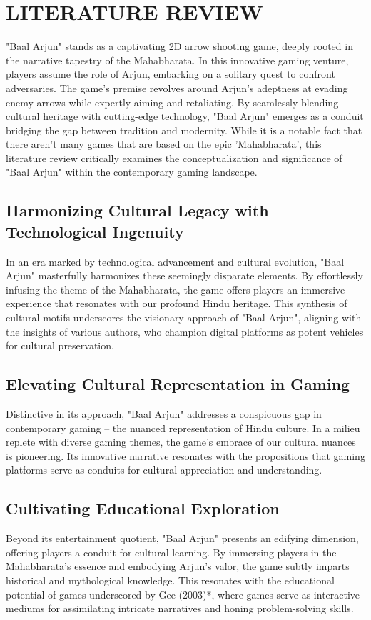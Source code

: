 \section{LITERATURE REVIEW}
"Baal Arjun" stands as a captivating 2D arrow shooting game, deeply rooted in the narrative tapestry of the Mahabharata. In this innovative gaming venture, players assume the role of Arjun, embarking on a solitary quest to confront adversaries. The game's premise revolves around Arjun's adeptness at evading enemy arrows while expertly aiming and retaliating. By seamlessly blending cultural heritage with cutting-edge technology, "Baal Arjun" emerges as a conduit bridging the gap between tradition and modernity. While it is  a notable fact that there aren't many games that are based on the epic 'Mahabharata', this literature review critically examines the conceptualization and significance of "Baal Arjun" within the contemporary gaming landscape.


\subsection{Harmonizing Cultural Legacy with Technological Ingenuity}
In an era marked by technological advancement and cultural evolution, "Baal Arjun" masterfully harmonizes these seemingly disparate elements. By effortlessly infusing the theme of the Mahabharata, the game offers players an immersive experience that resonates with our profound Hindu heritage. This synthesis of cultural motifs underscores the visionary approach of "Baal Arjun", aligning with the insights of various authors, who champion digital platforms as potent vehicles for cultural preservation.

\subsection{Elevating Cultural Representation in Gaming}
Distinctive in its approach, "Baal Arjun" addresses a conspicuous gap in contemporary gaming – the nuanced representation of Hindu culture. In a milieu replete with diverse gaming themes, the game's embrace of our cultural nuances is pioneering. Its innovative narrative resonates with the propositions that gaming platforms serve as conduits for cultural appreciation and understanding.

\subsection{Cultivating Educational Exploration}
Beyond its entertainment quotient, "Baal Arjun" presents an edifying dimension, offering players a conduit for cultural learning. By immersing players in the Mahabharata's essence and embodying Arjun's valor, the game subtly imparts historical and mythological knowledge. This resonates with the educational potential of games underscored by Gee (2003)*, where games serve as interactive mediums for assimilating intricate narratives and honing problem-solving skills.

